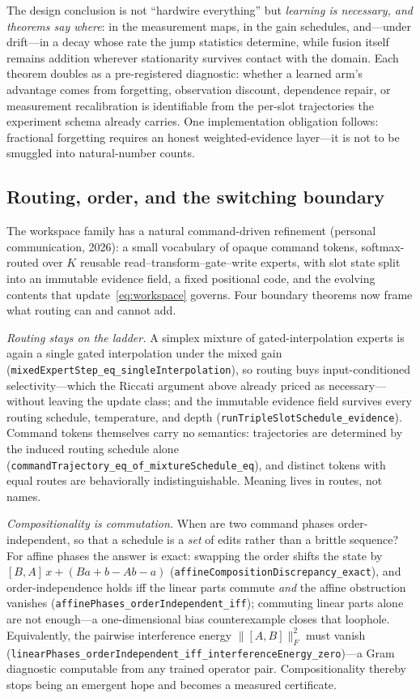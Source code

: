 \documentclass[11pt]{article}
\newcommand{\code}[1]{\texttt{#1}}
\begin{document}
The design conclusion is not ``hardwire everything'' but \emph{learning is necessary,
and theorems say where}: in the measurement maps, in the gain schedules, and---under
drift---in a decay whose rate the jump statistics determine, while fusion itself
remains addition wherever stationarity survives contact with the domain. Each theorem
doubles as a pre-registered diagnostic: whether a learned arm's advantage comes from
forgetting, observation discount, dependence repair, or measurement recalibration is
identifiable from the per-slot trajectories the experiment schema already carries. One
implementation obligation follows: fractional forgetting requires an honest
weighted-evidence layer---it is not to be smuggled into natural-number counts.

\subsection{Routing, order, and the switching boundary}
\label{sec:routing}

The workspace family has a natural command-driven refinement (personal communication,
2026): a small vocabulary of opaque command tokens, softmax-routed over $K$ reusable
read--transform--gate--write experts, with slot state split into an immutable evidence
field, a fixed positional code, and the evolving contents that
update~\eqref{eq:workspace} governs. Four boundary theorems now frame what routing can
and cannot add.

\emph{Routing stays on the ladder.} A simplex mixture of gated-interpolation experts is
again a single gated interpolation under the mixed gain
(\code{mixedExpertStep\_eq\_singleInterpolation}), so routing buys input-conditioned
selectivity---which the Riccati argument above already priced as necessary---without
leaving the update class; and the immutable evidence field survives every routing
schedule, temperature, and depth (\code{runTripleSlotSchedule\_evidence}). Command
tokens themselves carry no semantics: trajectories are determined by the induced
routing schedule alone (\code{commandTrajectory\_eq\_of\_mixtureSchedule\_eq}), and
distinct tokens with equal routes are behaviorally indistinguishable. Meaning lives in
routes, not names.

\emph{Compositionality is commutation.} When are two command phases order-independent,
so that a schedule is a \emph{set} of edits rather than a brittle sequence? For affine
phases the answer is exact: swapping the order shifts the state by
$[B,A]\,x + (Ba + b - Ab - a)$ (\code{affineCompositionDiscrepancy\_exact}), and
order-independence holds iff the linear parts commute \emph{and} the affine obstruction
vanishes (\code{affinePhases\_orderIndependent\_iff}); commuting linear parts alone are
not enough---a one-dimensional bias counterexample closes that loophole. Equivalently,
the pairwise interference energy $\lVert[A,B]\rVert_F^{2}$ must vanish
(\code{linearPhases\_orderIndependent\_iff\_interferenceEnergy\_zero})---a Gram
diagnostic computable from any trained operator pair. Compositionality thereby stops
being an emergent hope and becomes a measured certificate.
\end{document}
